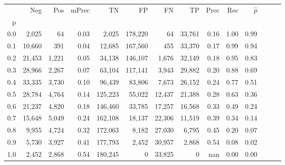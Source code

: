 \begin{tabular}{rrrrrrrrrrrrrr}
\toprule
{} &     Neg &    Pos & mPrec &       TN &       FP &      FN &      TP &  Prec &   Rec & $\hat{p}$ \\
p   &         &        &       &          &          &         &         &       &       &           \\
\midrule
0.0 &   2,025 &     64 &  0.03 &    2,025 &  178,220 &      64 &  33,761 &  0.16 &  1.00 &      0.99 \\
0.1 &  10,660 &    391 &  0.04 &   12,685 &  167,560 &     455 &  33,370 &  0.17 &  0.99 &      0.94 \\
0.2 &  21,453 &  1,221 &  0.05 &   34,138 &  146,107 &   1,676 &  32,149 &  0.18 &  0.95 &      0.83 \\
0.3 &  28,966 &  2,267 &  0.07 &   63,104 &  117,141 &   3,943 &  29,882 &  0.20 &  0.88 &      0.69 \\
0.4 &  33,335 &  3,730 &  0.10 &   96,439 &   83,806 &   7,673 &  26,152 &  0.24 &  0.77 &      0.51 \\
0.5 &  28,784 &  4,764 &  0.14 &  125,223 &   55,022 &  12,437 &  21,388 &  0.28 &  0.63 &      0.36 \\
0.6 &  21,237 &  4,820 &  0.18 &  146,460 &   33,785 &  17,257 &  16,568 &  0.33 &  0.49 &      0.24 \\
0.7 &  15,648 &  5,049 &  0.24 &  162,108 &   18,137 &  22,306 &  11,519 &  0.39 &  0.34 &      0.14 \\
0.8 &   9,955 &  4,724 &  0.32 &  172,063 &    8,182 &  27,030 &   6,795 &  0.45 &  0.20 &      0.07 \\
0.9 &   5,730 &  3,927 &  0.41 &  177,793 &    2,452 &  30,957 &   2,868 &  0.54 &  0.08 &      0.02 \\
1.0 &   2,452 &  2,868 &  0.54 &  180,245 &        0 &  33,825 &       0 &   nan &  0.00 &      0.00 \\
\bottomrule
\end{tabular}
